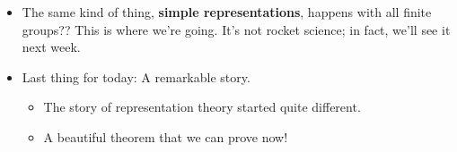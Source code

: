 \documentclass[../notes.tex]{subfiles}
\begin{document}
\begin{itemize}
\begin{itemize}
\begin{proof}
\begin{align*}
                Aw-w &= w-Aw\\
                2Aw &= 2w\\
                Aw &= w
            \end{align*}
            But then $w\in\ker(A-E)$, so $v=(A-E)w=0$.
        \end{proof}
        \item This combined with the fact that every vector in a vector space is in either the image or the kernel of a linear map\footnote{See Theorem 3.6 of \textcite{bib:Axler}.} implies that $V=\ker(A-E)\oplus\im(A-E)$.
        \item Let $\ker(A-E)$ have basis $e_1,\dots,e_k$ and let $\im(A-E)$ have basis $e_{k+1},\dots,n$; then all $A$ are of the following form.
        \begin{equation*}
            \begin{bNiceArray}{ccc|ccc}[margin,first-row,first-col]
                    & 1 &        & k & k+1 &        &  n\\
                1   & 1 &        &   &     &        &   \\
                    &   & \ddots &   &     &        &   \\
                k   &   &        & 1 &     &        &   \\
                \hline
                k+1 &   &        &   & -1  &        &   \\
                    &   &        &   &     & \ddots &   \\
                n   &   &        &   &     &        & -1\\
            \end{bNiceArray}
        \end{equation*}
        \item Next time, we will discuss sums of representations, of which this is an example of the theory.
    \end{itemize}
    \item The same kind of thing, \textbf{simple representations}, happens with all finite groups?? This is where we're going. It's not rocket science; in fact, we'll see it next week.
    \item Last thing for today: A remarkable story.
    \begin{itemize}
        \item The story of representation theory started quite different.
        \item A beautiful theorem that we can prove now!

\end{itemize}
\end{itemize}
\end{document}
